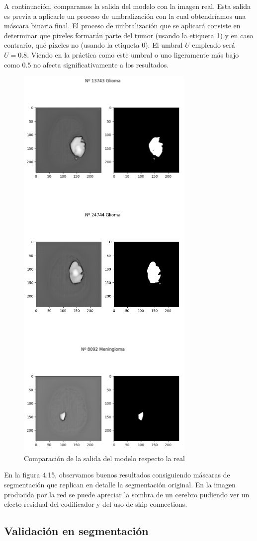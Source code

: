 A continuación, comparamos la salida del modelo con la imagen real. Esta salida es previa a aplicarle un proceso de umbralización con la cual obtendríamos una máscara binaria final. El proceso de umbralización que se aplicará consiste en determinar que píxeles formarán parte del tumor (usando la etiqueta 1) y en caso contrario, qué píxeles no (usando la etiqueta 0). El umbral $U$ empleado será $U = 0.8$. Viendo en la práctica como este umbral o uno ligeramente más bajo como $0.5$ no afecta significativamente a los resultados. 
\begin{figure}[H]
	\centering
	\includegraphics[width=0.5\linewidth]{imagenes/output_segmentation.png}
	\caption{Comparación de la salida del modelo respecto la real}
\end{figure}
En la figura 4.15, observamos buenos resultados consiguiendo máscaras de segmentación que replican en detalle la segmentación original. En la imagen producida por la red se puede apreciar la sombra de un cerebro pudiendo ver un efecto residual del codificador y del uso de skip connections.

\subsection{Validación en segmentación}

